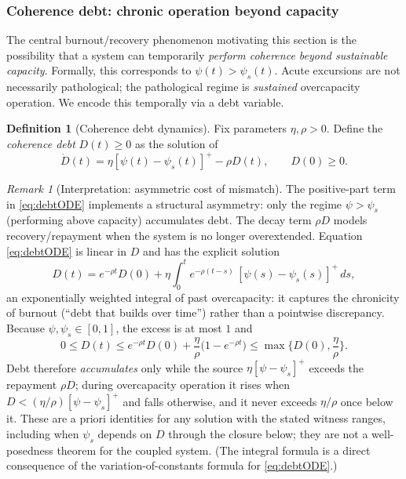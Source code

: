 \documentclass[11pt]{article}
\theoremstyle{plain}
\theoremstyle{definition}
\newtheorem{definition}[theorem]{Definition}
\theoremstyle{remark}
\newtheorem{remark}[theorem]{Remark}
\begin{document}
\subsubsection*{Coherence debt: chronic operation beyond capacity}
The central burnout/recovery phenomenon motivating this section is the possibility that a system can temporarily \emph{perform coherence beyond sustainable capacity}. Formally, this corresponds to $\psi(t)>\psi_s(t)$. Acute excursions are not necessarily pathological; the pathological regime is \emph{sustained} overcapacity operation. We encode this temporally via a debt variable.

\begin{definition}[Coherence debt dynamics]\label{def:debt}
Fix parameters $\eta,\rho>0$. Define the \emph{coherence debt} $D(t)\ge 0$ as the solution of
\begin{equation}\label{eq:debtODE}
\dot D(t)=\eta[\psi(t)-\psi_s(t)]^{+}-\rho D(t),
\qquad D(0)\ge 0.
\end{equation}
\end{definition}

\begin{remark}[Interpretation: asymmetric cost of mismatch]\label{rem:debtInterpretation}
The positive-part term in \eqref{eq:debtODE} implements a structural asymmetry:
only the regime $\psi>\psi_s$ (performing above capacity) accumulates debt.
The decay term $\rho D$ models recovery/repayment when the system is no longer overextended.
Equation \eqref{eq:debtODE} is linear in \(D\) and has the explicit solution
\[
D(t)=e^{-\rho t}D(0)+\eta\int_0^t e^{-\rho(t-s)}\,[\psi(s)-\psi_s(s)]^+\,ds ,
\]
an exponentially weighted integral of past overcapacity: it captures the chronicity of burnout (``debt that builds over time'') rather than a pointwise discrepancy. Because \(\psi,\psi_s\in[0,1]\), the excess is at most \(1\) and
\[
0\le D(t)\le e^{-\rho t}D(0)+\frac{\eta}{\rho}\big(1-e^{-\rho t}\big)\le\max\Big\{D(0),\frac\eta\rho\Big\}.
\]
Debt therefore \emph{accumulates} only while the source \(\eta[\psi-\psi_s]^+\) exceeds the repayment \(\rho D\); during overcapacity operation it rises when \(D<(\eta/\rho)[\psi-\psi_s]^+\) and falls otherwise, and it never exceeds \(\eta/\rho\) once below it. These are a priori identities for any solution with the stated witness ranges, including when \(\psi_s\) depends on \(D\) through the closure below; they are not a well-posedness theorem for the coupled system. (The integral formula is a direct consequence of the variation-of-constants formula for \eqref{eq:debtODE}.)
\end{remark}
\end{document}
